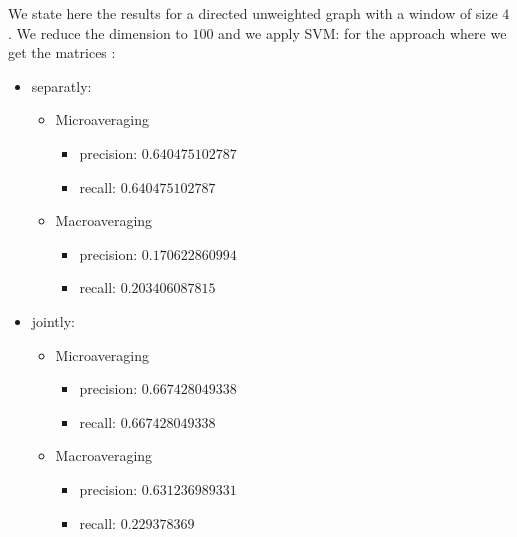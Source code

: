 We state here the results for a directed unweighted graph with a window of size $4$. We reduce the dimension to $100$ and we apply SVM: for the approach where we get the matrices :\\
\begin{itemize}
	 \item separatly: \begin{itemize}
	 	\item Microaveraging \begin{itemize}
	 		\item precision: $0.640475102787$ 
	 		\item recall: $0.640475102787$
	 	\end{itemize}
	 	\item Macroaveraging \begin{itemize}
	 		\item precision: $0.170622860994$
	 		\item recall: $0.203406087815$
	 	\end{itemize}
	 \end{itemize}
	 
	 \item jointly: \begin{itemize}
	 	\item Microaveraging \begin{itemize}
	 		\item precision: $0.667428049338$ 
	 		\item recall: $0.667428049338$
	 	\end{itemize}
	 	\item Macroaveraging \begin{itemize}
	 		\item precision: $0.631236989331$
	 		\item recall: $0.229378369$
	 	\end{itemize}
	 \end{itemize}
\end{itemize}


